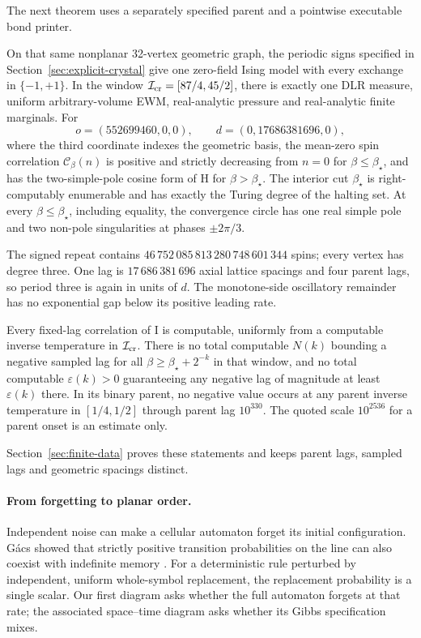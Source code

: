 \newpage
The next theorem uses a separately specified parent and a pointwise executable bond printer.
\begin{theoremI}\label{thm:I}
On that same nonplanar 32-vertex geometric graph, the periodic signs specified in Section~\ref{sec:explicit-crystal} give one zero-field Ising model with every exchange in \(\{-1,+1\}\). In the window \(\mathcal I_{\rm cr}=[87/4,45/2]\), there is exactly one DLR measure, uniform arbitrary-volume EWM, real-analytic pressure and real-analytic finite marginals. For
\[
o=(552699460,0,0),\qquad d=(0,17686381696,0),
\]
where the third coordinate indexes the geometric basis, the mean-zero spin correlation \(\mathcal C_\beta(n)\) is positive and strictly decreasing from \(n=0\) for \(\beta\le\beta_\star\), and has the two-simple-pole cosine form of H for \(\beta>\beta_\star\). The interior cut \(\beta_\star\) is right-computably enumerable and has exactly the Turing degree of the halting set. At every \(\beta\le\beta_\star\), including equality, the convergence circle has one real simple pole and two non-pole singularities at phases \(\pm2\pi/3\).
\end{theoremI}
The signed repeat contains \(46\,752\,085\,813\,280\,748\,601\,344\) spins; every vertex has degree three. One lag is \(17\,686\,381\,696\) axial lattice spacings and four parent lags, so period three is again in units of \(d\). The monotone-side oscillatory remainder has no exponential gap below its positive leading rate.
\begin{proposition}\label{prop:finite-data}
Every fixed-lag correlation of I is computable, uniformly from a computable inverse temperature in \(\mathcal I_{\rm cr}\). There is no total computable \(N(k)\) bounding a negative sampled lag for all \(\beta\ge\beta_\star+2^{-k}\) in that window, and no total computable \(\varepsilon(k)>0\) guaranteeing any negative lag of magnitude at least \(\varepsilon(k)\) there. In its binary parent, no negative value occurs at any parent inverse temperature in \([1/4,1/2]\) through parent lag \(10^{330}\). The quoted scale \(10^{2536}\) for a parent onset is an estimate only.
\end{proposition}
Section~\ref{sec:finite-data} proves these statements and keeps parent lags, sampled lags and geometric spacings distinct.

\paragraph{From forgetting to planar order.}
Independent noise can make a cellular automaton forget its initial configuration. G\'acs showed that strictly positive transition probabilities on the line can also coexist with indefinite memory \cite{gacs86,gacs01}. For a deterministic rule perturbed by independent, uniform whole-symbol replacement, the replacement probability is a single scalar. Our first diagram asks whether the full automaton forgets at that rate; the associated space--time diagram asks whether its Gibbs specification mixes.

